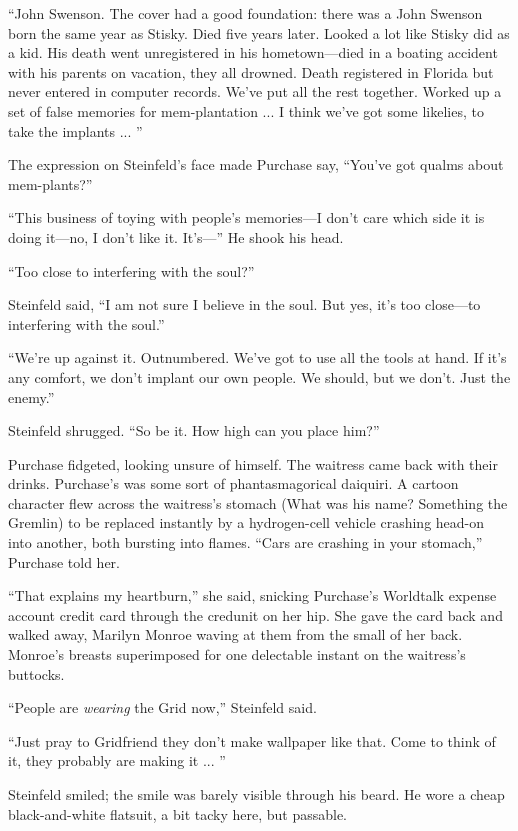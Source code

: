 ``John Swenson. The cover had a good foundation: there was a John Swenson born the same year as Stisky. Died five years later. Looked a lot like Stisky did as a kid. His death went unregistered in his hometown---died in a boating accident with his parents on vacation, they all drowned. Death registered in Florida but never entered in computer records. We've put all the rest together. Worked up a set of false memories for mem-plantation ... I think we've got some likelies, to take the implants ... ''

The expression on Steinfeld's face made Purchase say, ``You've got qualms about mem-plants?''

``This business of toying with people's memories---I don't care which side it is doing it---no, I don't like it. It's---'' He shook his head.

``Too close to interfering with the soul?''

Steinfeld said, ``I am not sure I believe in the soul. But yes, it's too close---to interfering with the soul.''

``We're up against it. Outnumbered. We've got to use all the tools at hand. If it's any comfort, we don't implant our own people. We should, but we don't. Just the enemy.''

Steinfeld shrugged. ``So be it. How high can you place him?''

Purchase fidgeted, looking unsure of himself. The waitress came back with their drinks. Purchase's was some sort of phantasmagorical daiquiri. A cartoon character flew across the waitress's stomach (What was his name? Something the Gremlin) to be replaced instantly by a hydrogen-cell vehicle crashing head-on into another, both bursting into flames. ``Cars are crashing in your stomach,'' Purchase told her.

``That explains my heartburn,'' she said, snicking Purchase's Worldtalk expense account credit card through the credunit on her hip. She gave the card back and walked away, Marilyn Monroe waving at them from the small of her back. Monroe's breasts superimposed for one delectable instant on the waitress's buttocks.

``People are \textit{wearing} the Grid now,'' Steinfeld said.

``Just pray to Gridfriend they don't make wallpaper like that. Come to think of it, they probably are making it ... ''

Steinfeld smiled; the smile was barely visible through his beard. He wore a cheap black-and-white flatsuit, a bit tacky here, but passable.


